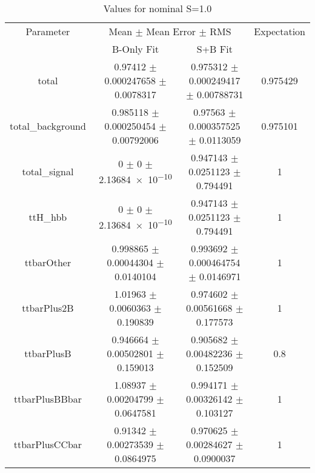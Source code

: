 \begin{table}
\centering
\caption{Values for nominal S=1.0}
\begin{tabular}{cccc}
\toprule
Parameter & \multicolumn{2}{c}{Mean $\pm$ Mean Error $\pm$ RMS} & Expectation\\
 & B-Only Fit & S+B Fit & \\
\midrule
total & \num{0.97412} $\pm$ \num{0.000247658} $\pm$ \num{0.0078317} & \num{0.975312} $\pm$ \num{0.000249417} $\pm$ \num{0.00788731} & \num{0.975429}\\
total\_background & \num{0.985118} $\pm$ \num{0.000250454} $\pm$ \num{0.00792006} & \num{0.97563} $\pm$ \num{0.000357525} $\pm$ \num{0.0113059} & \num{0.975101}\\
total\_signal & \num{0} $\pm$ \num{0} $\pm$ \num{2.13684e-10} & \num{0.947143} $\pm$ \num{0.0251123} $\pm$ \num{0.794491} & \num{1}\\
ttH\_hbb & \num{0} $\pm$ \num{0} $\pm$ \num{2.13684e-10} & \num{0.947143} $\pm$ \num{0.0251123} $\pm$ \num{0.794491} & \num{1}\\
ttbarOther & \num{0.998865} $\pm$ \num{0.00044304} $\pm$ \num{0.0140104} & \num{0.993692} $\pm$ \num{0.000464754} $\pm$ \num{0.0146971} & \num{1}\\
ttbarPlus2B & \num{1.01963} $\pm$ \num{0.0060363} $\pm$ \num{0.190839} & \num{0.974602} $\pm$ \num{0.00561668} $\pm$ \num{0.177573} & \num{1}\\
ttbarPlusB & \num{0.946664} $\pm$ \num{0.00502801} $\pm$ \num{0.159013} & \num{0.905682} $\pm$ \num{0.00482236} $\pm$ \num{0.152509} & \num{0.8}\\
ttbarPlusBBbar & \num{1.08937} $\pm$ \num{0.00204799} $\pm$ \num{0.0647581} & \num{0.994171} $\pm$ \num{0.00326142} $\pm$ \num{0.103127} & \num{1}\\
ttbarPlusCCbar & \num{0.91342} $\pm$ \num{0.00273539} $\pm$ \num{0.0864975} & \num{0.970625} $\pm$ \num{0.00284627} $\pm$ \num{0.0900037} & \num{1}\\
\bottomrule
\end{tabular}
\end{table}